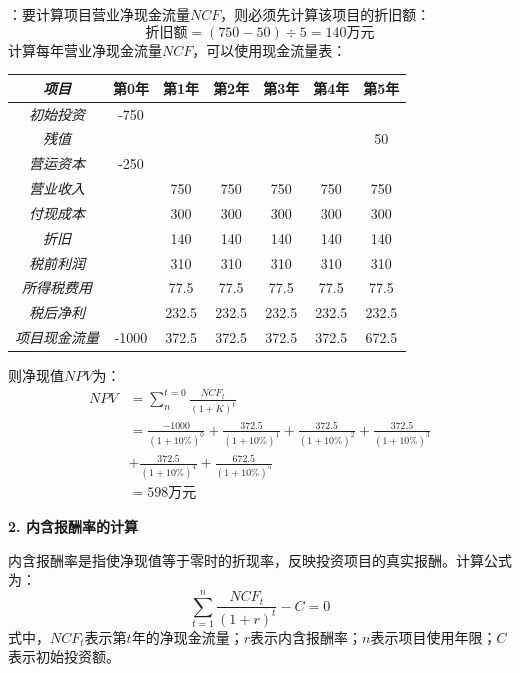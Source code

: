\documentclass[
  10pt,
  twoside,
  openany,
  b5paper, %
  colorscheme = black, %
  xits = false,
]{qyxf-book}
\begin{document}
\solve[答]：要计算项目营业净现金流量$NCF$，则必须先计算该项目的折旧额：
\begin{equation*}
	\text{折旧额} = (750-50) \div 5 = 140 \text{万元}
\end{equation*}
计算每年营业净现金流量$NCF$，可以使用现金流量表：
\begin{center}
	\begin{tabular}{ccccccc}
		\toprule
		\emph{项目} & 第0年 & 第1年 & 第2年 & 第3年 & 第4年 & 第5年 \\
		\midrule
		\emph{初始投资} & -750 & & & & & \\
		\emph{残值} & & & & & & 50 \\
		\emph{营运资本} & -250 & & & & & \\
		\emph{营业收入} &  & 750 & 750 & 750 & 750 & 750 \\
		\emph{付现成本} & & 300 & 300 & 300 & 300 & 300 \\
		\emph{折旧} & & 140 & 140 & 140 & 140 & 140 \\
		\emph{税前利润} & & 310 & 310 & 310 & 310 & 310 \\
		\emph{所得税费用} & & 77.5 & 77.5 & 77.5 & 77.5 & 77.5 \\
		\emph{税后净利} & & 232.5 & 232.5 & 232.5 & 232.5 & 232.5 \\
		\emph{项目现金流量} & -1000  & 372.5 & 372.5 & 372.5 & 372.5 & 672.5 \\
		\bottomrule
	\end{tabular}
\end{center}

则净现值$NPV$为：
\begin{equation*}
	\begin{aligned}
		NPV &= \sum_{n}^{t=0} \frac{NCF_t}{(1+K)^t} \\
		&= \frac{-1000}{(1+10\%)^0} + \frac{372.5}{(1+10\%)^1} + \frac{372.5}{(1+10\%)^2} + \frac{372.5}{(1+10\%)^3} \\[1.5ex] &+  \frac{372.5}{(1+10\%)^4} +
		\frac{672.5}{(1+10\%)^5} \\[1.5ex]
		&= 598 \text{万元}
	\end{aligned}
\end{equation*}

\textbf{2. 内含报酬率的计算}

内含报酬率是指使净现值等于零时的折现率，反映投资项目的真实报酬。计算公式为：
\begin{equation*}
	\sum_{t=1}^{n} \frac{NCF_t}{(1+r)^t}-C =0
\end{equation*}
式中，$NCF_t$表示第$t$年的净现金流量；$r$表示内含报酬率；$n$表示项目使用年限；$C$表示初始投资额。
\end{document}
